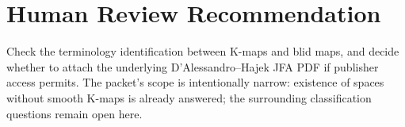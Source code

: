 \documentclass[11pt]{article}
\begin{document}
\section*{Human Review Recommendation}

Check the terminology identification between K-maps and blid maps, and
decide whether to attach the underlying D'Alessandro--Hajek JFA PDF if
publisher access permits.  The packet's scope is intentionally narrow:
existence of spaces without smooth K-maps is already answered; the surrounding
classification questions remain open here.
\end{document}
